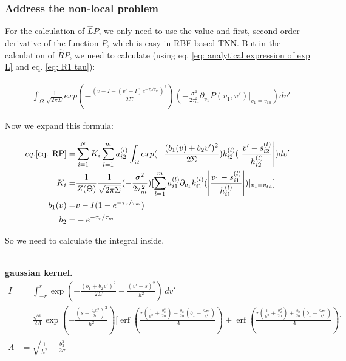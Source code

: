 \documentclass{article}
\begin{document}
	\subsubsection{Address the non-local problem}
	
	For the calculation of $\hat{L}P$, we only need to use the value and first, second-order derivative of the function $P$, which is easy in RBF-based TNN. But in the calculation of $\hat{R}P$, we need to calculate (using eq. \eqref{eq: analytical expression of exp L} and eq. \eqref{eq: R1 tau}):
	
	\begin{align}
	&\int_{\Omega}\frac{1}{\sqrt{2\pi\Sigma}}exp(-\frac{(v-I-(v'-I)e^{-\tau_r/\tau_m})^2}{2\Sigma})(-\frac{\sigma^2}{2\tau_m^2}\partial_{v_1}P(v_1,v')|_{v_1=v_{th}}) dv'
	\label{eq. RP}
	\end{align}
	
	Now we expand this formula:
	
	\begin{align}
		eq.\eqref{eq. RP}=&\sum_{i=1}^NK_i\sum_{l=1}^ma_{i2}^{(l)}\int_{\Omega}exp(-\frac{(b_1(v)+b_2v')^2}{2\Sigma})k_{i2}^{(l)}(\abs{\frac{v'-s_{i2}^{(l)}}{h_{i2}^{(l)}}})dv'\notag\\
		K_i=&\frac{1}{Z(\Theta)}\frac{1}{\sqrt{2\pi\Sigma}}(-\frac{\sigma^2}{2\tau_m^2})[\sum_{l=1}^ma_{i1}^{(l)}\partial_{v_1}k_{i1}^{(l)}(\abs{\frac{v_1-s_{i1}^{(l)}}{h_{i1}^{(l)}}})|_{v_1=v_{th}}]\notag\\
		b_1(v)=&v-I(1-e^{-\tau_r/\tau_m})\notag\\
		b_2=&-e^{-\tau_r/\tau_m}
	\end{align}	
	
	So we need to calculate the integral inside.
	
	~\\
	
	\textbf{gaussian kernel.}
	\begin{equation}
		\begin{aligned}
			I
			&=\int_{-r}^{r}
			\exp\!\left(
			-\frac{(b_1+b_2 v')^2}{2\Sigma}
			-\frac{(v'-s)^2}{h^2}
			\right)\,dv' \\[6pt]
	&=	\frac{\sqrt{\pi}}{2\Lambda}
	\exp\!\left(
	-\frac{\left(s-\frac{b_1 h^2}{2\sigma}\right)^2}{h^2}
	\right)
	\Bigg[
	\operatorname{erf}\!\left(
	\frac{
		r\!\left(\frac{1}{h^2}+\frac{b_2^2}{2\sigma}\right)
		-\frac{b_2}{2\sigma}\!\left(b_1-\frac{2\sigma s}{h^2}\right)
	}{\Lambda}
	\right)
	+
	\operatorname{erf}\!\left(
	\frac{
		r\!\left(\frac{1}{h^2}+\frac{b_2^2}{2\sigma}\right)
		+\frac{b_2}{2\sigma}\!\left(b_1-\frac{2\sigma s}{h^2}\right)
	}{\Lambda}
	\right)
	\Bigg]\\
	\Lambda&= \sqrt{\frac{1}{h^2}+\frac{b_2^2}{2\sigma}}
\end{aligned}
\end{equation}
	
\end{document}
